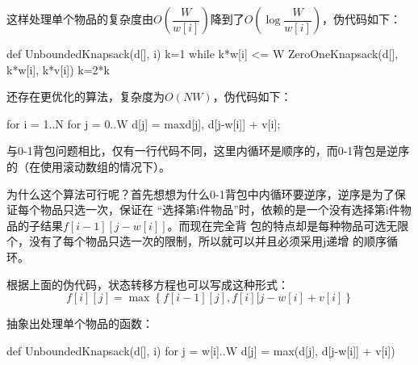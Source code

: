 这样处理单个物品的复杂度由$O\left(\dfrac{W}{w[i]}\right)$降到了$O\left(\log \dfrac{W}{w[i]}\right)$，伪代码如下：
\begin{Code}
def UnboundedKnapsack(d[], i)
    k=1
    while k*w[i] <= W
        ZeroOneKnapsack(d[], k*w[i], k*v[i])
        k=2*k
\end{Code}

还存在更优化的算法，复杂度为$O(NW)$，伪代码如下：
\begin{Code}
for i = 1..N
    for j = 0..W
        d[j] = max{d[j], d[j-w[i]] + v[i]};
\end{Code}

与0-1背包问题相比，仅有一行代码不同，这里内循环是顺序的，而0-1背包是逆序的（在使用滚动数组的情况下）。

为什么这个算法可行呢？首先想想为什么0-1背包中内循环要逆序，逆序是为了保证每个物品只选一次，保证在
“选择第i件物品”时，依赖的是一个没有选择第i件物品的子结果$f[i-1][j-w[i]]$。而现在完全背
包的特点却是每种物品可选无限个，没有了每个物品只选一次的限制，所以就可以并且必须采用j递增
的顺序循环。

根据上面的伪代码，状态转移方程也可以写成这种形式：
$$f[i][j]=\max\left\{f[i-1][j], f[i][j-w[i]+v[i]\right\}$$

抽象出处理单个物品的函数：
\begin{Code}
def UnboundedKnapsack(d[], i)
    for j = w[i]..W
        d[j] = max(d[j], d[j-w[i]] + v[i])
\end{Code}

